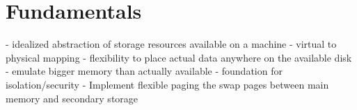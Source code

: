 \chapter{Fundamentals} %

\label{chap:fund}

- idealized abstraction of storage resources available on a machine
- virtual to physical mapping
- flexibility to place actual data anywhere on the available disk
- emulate bigger memory than actually available
- foundation for isolation/security
- Implement flexible paging the swap pages between main memory and secondary storage





